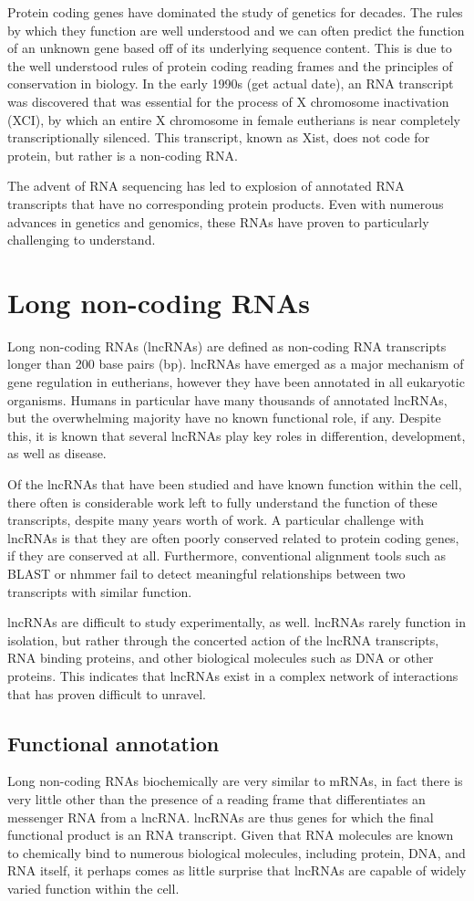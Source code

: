 Protein coding genes have dominated the study of genetics for decades. The rules by which they function are well understood and we can often predict the function of an unknown gene based off of its underlying sequence content. This is due to the well understood rules of protein coding reading frames and the principles of conservation in biology. In the early 1990s (get actual date), an RNA transcript was discovered that was essential for the process of X chromosome inactivation (XCI), by which an entire X chromosome in female eutherians is near completely transcriptionally silenced. This transcript, known as Xist, does not code for protein, but rather is a non-coding RNA.

The advent of RNA sequencing has led to explosion of annotated RNA transcripts that have no corresponding protein products. Even with numerous advances in genetics and genomics, these RNAs have proven to particularly challenging to understand. 
\section{Long non-coding RNAs}
Long non-coding RNAs (lncRNAs) are defined as non-coding RNA transcripts longer than 200 base pairs (bp). lncRNAs have emerged as a major mechanism of gene regulation in eutherians, however they have been annotated in all eukaryotic organisms. Humans in particular have many thousands of annotated lncRNAs, but the overwhelming majority have no known functional role, if any. Despite this, it is known that several lncRNAs play key roles in differention, development, as well as disease. 

Of the lncRNAs that have been studied and have known function within the cell, there often is considerable work left to fully understand the function of these transcripts, despite many years worth of work. A particular challenge with lncRNAs is that they are often poorly conserved related to protein coding genes, if they are conserved at all. Furthermore, conventional alignment tools such as BLAST or nhmmer fail to detect meaningful relationships between two transcripts with similar function. 

lncRNAs are difficult to study experimentally, as well. lncRNAs rarely function in isolation, but rather through the concerted action of the lncRNA transcripts, RNA binding proteins, and other biological molecules such as DNA or other proteins. This indicates that lncRNAs exist in a complex network of interactions that has proven difficult to unravel. 
\subsection{Functional annotation}
Long non-coding RNAs biochemically are very similar to mRNAs, in fact there is very little other than the presence of a reading frame that differentiates an messenger RNA from a lncRNA. lncRNAs are thus genes for which the final functional product is an RNA transcript. Given that RNA molecules are known to chemically bind to numerous biological molecules, including protein, DNA, and RNA itself, it perhaps comes as little surprise that lncRNAs are capable of widely varied function within the cell. 

